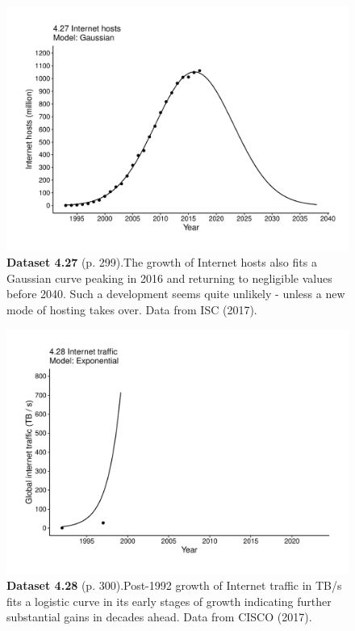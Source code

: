 \documentclass[aps,rmp,preprint,superscriptaddress,10pt,onecolumn]{article}
\begin{document}
\clearpage
\begin{figure}[h]
\includegraphics[width=\textwidth]{output/figs-ggplot/4.27.pdf}
\caption*{\textbf{Dataset 4.27} (p. 299).The growth of Internet hosts also fits a Gaussian curve peaking in 2016 and returning to negligible values before 2040. Such a development seems quite unlikely - unless a new mode of hosting takes over. Data from ISC (2017).}
\end{figure}
	
\clearpage
\begin{figure}[h]
\includegraphics[width=\textwidth]{output/figs-ggplot/4.28.pdf}
\caption*{\textbf{Dataset 4.28} (p. 300).Post-1992 growth of Internet traffic in TB/s fits a logistic curve in its early stages of growth indicating further substantial gains in decades ahead. Data from CISCO (2017).}
\end{figure}
	
\end{document}
